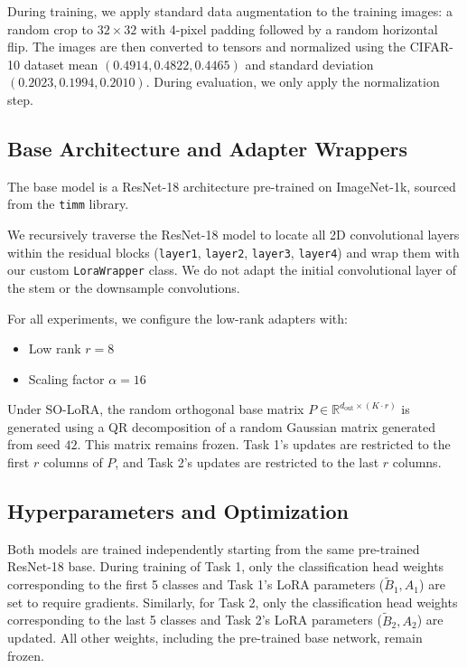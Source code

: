 \documentclass{article}
\theoremstyle{plain}
\theoremstyle{definition}
\theoremstyle{remark}
\begin{document}
During training, we apply standard data augmentation to the training images: a random crop to $32 \times 32$ with 4-pixel padding followed by a random horizontal flip. The images are then converted to tensors and normalized using the CIFAR-10 dataset mean $(0.4914, 0.4822, 0.4465)$ and standard deviation $(0.2023, 0.1994, 0.2010)$. During evaluation, we only apply the normalization step.

\subsection{Base Architecture and Adapter Wrappers}
The base model is a ResNet-18 architecture pre-trained on ImageNet-1k, sourced from the \texttt{timm} library. 

We recursively traverse the ResNet-18 model to locate all 2D convolutional layers within the residual blocks (\texttt{layer1}, \texttt{layer2}, \texttt{layer3}, \texttt{layer4}) and wrap them with our custom \texttt{LoraWrapper} class. We do not adapt the initial convolutional layer of the stem or the downsample convolutions.

For all experiments, we configure the low-rank adapters with:
\begin{itemize}
  \item Low rank $r = 8$
  \item Scaling factor $\alpha = 16$
\end{itemize}
Under SO-LoRA, the random orthogonal base matrix $P \in \mathbb{R}^{d_{\text{out}} \times (K \cdot r)}$ is generated using a QR decomposition of a random Gaussian matrix generated from seed $42$. This matrix remains frozen. Task 1's updates are restricted to the first $r$ columns of $P$, and Task 2's updates are restricted to the last $r$ columns.

\subsection{Hyperparameters and Optimization}
Both models are trained independently starting from the same pre-trained ResNet-18 base. 
During training of Task 1, only the classification head weights corresponding to the first 5 classes and Task 1's LoRA parameters ($\tilde{B}_1, A_1$) are set to require gradients. Similarly, for Task 2, only the classification head weights corresponding to the last 5 classes and Task 2's LoRA parameters ($\tilde{B}_2, A_2$) are updated. All other weights, including the pre-trained base network, remain frozen.
\end{document}
